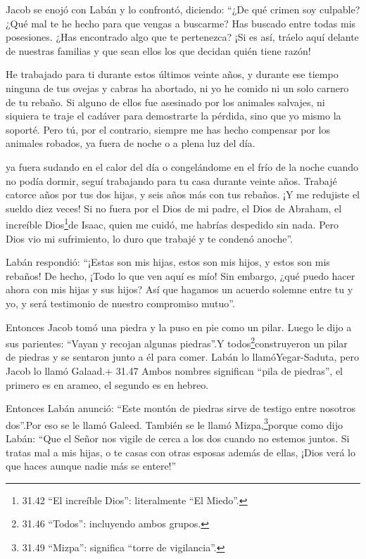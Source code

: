  Jacob se enojó con Labán y lo confrontó, diciendo: ``¿De
qué crimen soy culpable? ¿Qué mal te he hecho para que vengas a
buscarme?  Has buscado entre todas mis posesiones. ¿Has
encontrado algo que te pertenezca? ¡Si es así, tráelo aquí delante de
nuestras familias y que sean ellos los que decidan quién tiene razón!

 He trabajado para ti durante estos últimos veinte años, y
durante ese tiempo ninguna de tus ovejas y cabras ha abortado, ni yo he
comido ni un solo carnero de tu rebaño.  Si alguno de ellos
fue asesinado por los animales salvajes, ni siquiera te traje el cadáver
para demostrarte la pérdida, sino que yo mismo la soporté. Pero tú, por
el contrario, siempre me has hecho compensar por los animales robados,
ya fuera de noche o a plena luz del día.

 ya fuera sudando en el calor del día o congelándome en el
frío de la noche cuando no podía dormir, seguí trabajando para tu casa
durante veinte años.  Trabajé catorce años por tus dos
hijas, y seis años más con tus rebaños. ¡Y me redujiste el sueldo diez
veces!  Si no fuera por el Dios de mi padre, el Dios de
Abraham, el increíble Dios\footnote{31.42 ``El increíble Dios'':
  literalmente ``El Miedo''.}de Isaac, quien me cuidó, me habrías
despedido sin nada. Pero Dios vio mi sufrimiento, lo duro que trabajé y
te condenó anoche''.

 Labán respondió: ``¡Estas son mis hijas, estos son mis
hijos, y estos son mis rebaños! De hecho, ¡Todo lo que ven aquí es mío!
Sin embargo, ¿qué puedo hacer ahora con mis hijas y sus hijos?
 Así que hagamos un acuerdo solemne entre tu y yo, y será
testimonio de nuestro compromiso mutuo''.

 Entonces Jacob tomó una piedra y la puso en pie como un
pilar.  Luego le dijo a sus parientes: ``Vayan y recojan
algunas piedras''.Y todos\footnote{31.46 ``Todos'': incluyendo ambos
  grupos.}construyeron un pilar de piedras y se sentaron junto a él para
comer.  Labán lo llamóYegar-Saduta, pero Jacob lo llamó
Galaad.+ 31.47 Ambos nombres significan ``pila de piedras'', el primero
es en arameo, el segundo es en hebreo.

 Entonces Labán anunció: ``Este montón de piedras sirve de
testigo entre nosotros dos''.Por eso se le llamó Galeed. 
También se le llamó Mizpa,\footnote{31.49 ``Mizpa'': significa ``torre
  de vigilancia''.}porque como dijo Labán: ``Que el Señor nos vigile de
cerca a los dos cuando no estemos juntos.  Si tratas mal a
mis hijas, o te casas con otras esposas además de ellas, ¡Dios verá lo
que haces aunque nadie más se entere!''


